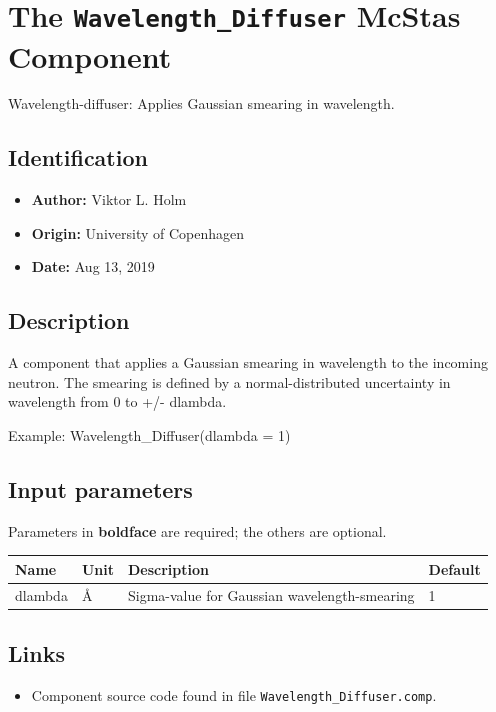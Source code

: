 \section{The \texttt{Wavelength\_Diffuser} McStas Component}
Wavelength-diffuser: Applies Gaussian smearing in wavelength.

\subsection*{Identification}
\begin{itemize}
  \item \textbf{Author:} Viktor L. Holm
  \item \textbf{Origin:} University of Copenhagen
  \item \textbf{Date:} Aug 13, 2019
\end{itemize}

\subsection*{Description}
A component that applies a Gaussian smearing in wavelength to the incoming neutron. The smearing is defined by a normal-distributed uncertainty in wavelength from 0 to +/- dlambda.

Example: Wavelength\_Diffuser(dlambda = 1)

\subsection*{Input parameters}
Parameters in \textbf{boldface} are required; the others are optional.

\begin{longtable}{p{}p{}p{}p{}}
\toprule
\textbf{Name} & \textbf{Unit} & \textbf{Description} & \textbf{Default} \\
\midrule
\endhead
dlambda & \AA{} & Sigma-value for Gaussian wavelength-smearing & 1 \\
\bottomrule
\end{longtable}

\subsection*{Links}
\begin{itemize}
  \item Component source code found in file \texttt{Wavelength\_Diffuser.comp}.
\end{itemize}
